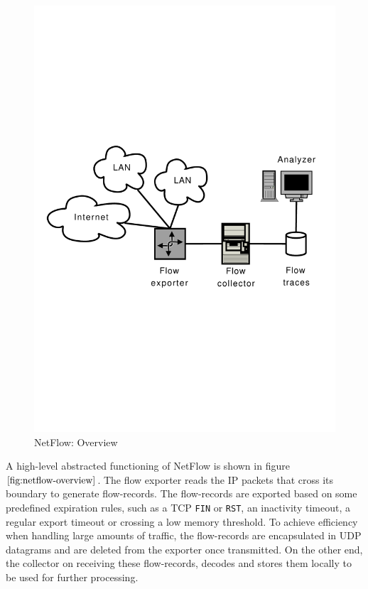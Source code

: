 \begin{figure}[h!]
\begin{center}
  \includegraphics* [width=0.7\linewidth]{figures/netflow-overview}	
  \caption{NetFlow: Overview \cite{nmelnikov:thesis:2010}}
  \label{fig:netflow-overview}
\end{center}
\end{figure}
A high-level abstracted functioning of NetFlow is shown in figure $\ref{fig:netflow-overview}$. The flow exporter reads the \ac{IP} packets that cross its boundary to generate flow-records. The flow-records are exported based on some predefined expiration rules, such as a \ac{TCP} \texttt{FIN} or \texttt{RST}, an inactivity timeout, a regular export timeout or crossing a low memory threshold. To achieve efficiency when handling large amounts of traffic, the flow-records are encapsulated in \ac{UDP} datagrams  and are deleted from the exporter once transmitted. On the other end, the collector on receiving these flow-records, decodes and stores them locally to be used for further processing. 


